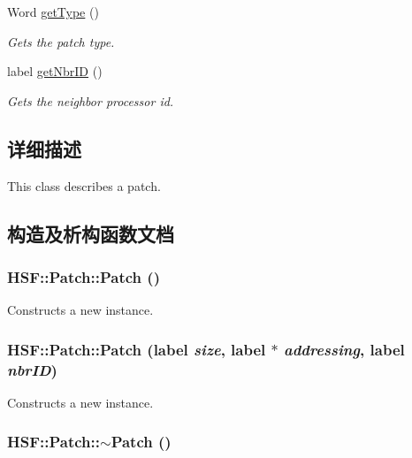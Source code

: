 \begin{DoxyCompactItemize}
Word \hyperlink{classHSF_1_1Patch_ae4f0f1deddb67c117a07175c20854506}{getType} ()
\begin{DoxyCompactList}\small\item\em Gets the patch type. \item\end{DoxyCompactList}\item 
label \hyperlink{classHSF_1_1Patch_ab3cc0b6c67fc04242ce059e4b2121352}{getNbrID} ()
\begin{DoxyCompactList}\small\item\em Gets the neighbor processor id. \item\end{DoxyCompactList}\end{DoxyCompactItemize}


\subsection{详细描述}
This class describes a patch. 

\subsection{构造及析构函数文档}
\hypertarget{classHSF_1_1Patch_a8bbb4ee433e8b808809e1de6ccc4b06a}{
\subsubsection[{Patch}]{\setlength{\rightskip}{0pt plus 5cm}HSF::Patch::Patch ()}}
\label{classHSF_1_1Patch_a8bbb4ee433e8b808809e1de6ccc4b06a}


Constructs a new instance. \hypertarget{classHSF_1_1Patch_a9a1d8945a0e699397820dc7c83dd706f}{
\subsubsection[{Patch}]{\setlength{\rightskip}{0pt plus 5cm}HSF::Patch::Patch (label {\em size}, \/  label $\ast$ {\em addressing}, \/  label {\em nbrID})}}
\label{classHSF_1_1Patch_a9a1d8945a0e699397820dc7c83dd706f}


Constructs a new instance. \hypertarget{classHSF_1_1Patch_ac4002381f5600d00ce48e8d2a1d979c4}{
\subsubsection[{$\sim$Patch}]{\setlength{\rightskip}{0pt plus 5cm}HSF::Patch::$\sim$Patch ()}}
\label{classHSF_1_1Patch_ac4002381f5600d00ce48e8d2a1d979c4}


